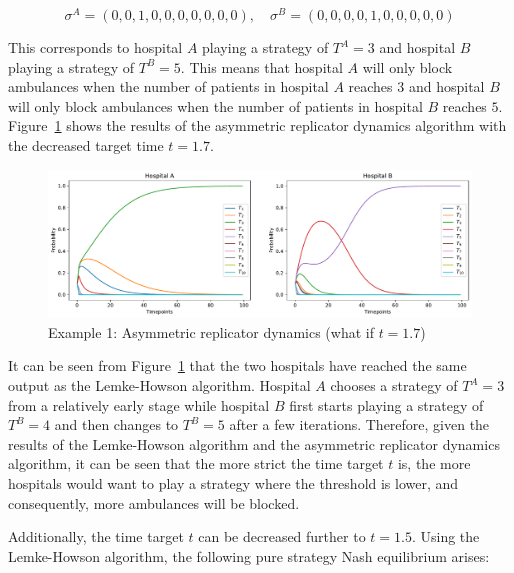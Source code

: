 \begin{equation}
    \sigma^A = (0, 0, 1, 0, 0, 0, 0, 0, 0, 0), \quad
    \sigma^B = (0, 0, 0, 0, 1, 0, 0, 0, 0, 0)
\end{equation}

This corresponds to hospital \(A\) playing a strategy of \(T^A = 3\) and
hospital \(B\) playing a strategy of \(T^B = 5\).
This means that hospital \(A\) will only block ambulances when the number of
patients in hospital \(A\) reaches \(3\) and hospital \(B\) will only block
ambulances when the number of patients in hospital \(B\) reaches \(5\).
Figure~\ref{fig:asymmetric_replicator_dynamics_example_1_what_if_1} shows the
results of the asymmetric replicator dynamics algorithm with the decreased
target time \(t = 1.7\).

\begin{figure}[H]
    \centering
    \includegraphics[width=\linewidth]{chapters/05_numerical_results/Bin/example_1/what_if_t_1.7.pdf}
    \caption{Example 1: Asymmetric replicator dynamics (what if \(t = 1.7\))}
    \label{fig:asymmetric_replicator_dynamics_example_1_what_if_1}
\end{figure}

It can be seen from
Figure~\ref{fig:asymmetric_replicator_dynamics_example_1_what_if_1} that the
two hospitals have reached the same output as the Lemke-Howson algorithm.
Hospital \(A\) chooses a strategy of \(T^A=3\) from a relatively early stage
while hospital \(B\) first starts playing a strategy of \(T^B=4\) and then
changes to \(T^B=5\) after a few iterations.
Therefore, given the results of the Lemke-Howson algorithm and the asymmetric
replicator dynamics algorithm, it can be seen that the more strict the time
target \(t\) is, the more hospitals would want to play a strategy where the
threshold is lower, and consequently, more ambulances will be blocked.

Additionally, the time target \(t\) can be decreased further to \(t = 1.5\).
Using the Lemke-Howson algorithm, the following pure strategy Nash equilibrium
arises:

